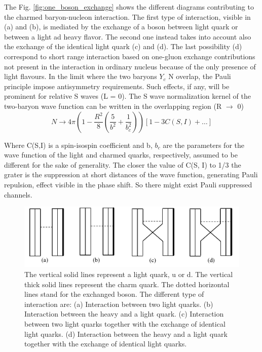 \documentclass[12pt,a4paper]{book}
\begin{document}
	The Fig. \ref{fig:one_boson_exchange} shows the different diagrams contributing to the charmed baryon-nucleon interaction. The first type of interaction, visible in (a) and (b), is mediated by the exchange of a boson between light quark or between a light ad heavy flavor. The second one instead takes into account also the exchange of the identical light quark (c) and (d). The last possibility (d) correspond to short range interaction based on one-gluon exchange contributions not present in the interaction in ordinary nucleus because of the only presence of light flavours. In the limit where the two baryons $Y_c$ N overlap, the Pauli principle impose antisymmetry requirements. Such effects, if any, will be prominent for relative S waves (L = 0).
	The S wave normalization kernel of the two-baryon wave function can be written in the overlapping region (R $\rightarrow$ 0)
	\begin{equation}
		N \rightarrow  4 \pi \left( 1 - \frac{R^2}{8} \left( \frac{5}{b^2} + \frac{1}{b_c^2} \right) \right) \left[ 1 - 3C(S,I) + \dots \right]
	\end{equation}
	
	Where C(S,I) is a spin-isospin coefficient and b, $b_c$ are the parameters for the wave function of the light and charmed quarks, respectively, assumed to be different for the
	sake of generality. The closer the value of C(S, I) to 1/3 the grater is  the suppression at short distances of the wave function, generating Pauli repulsion, effect visible in the phase shift. So there might exist Pauli suppressed channels. 
	
	\begin{figure}[ht]
		\centering
		\includegraphics[width=0.7\linewidth]{pictures/charmed_nucleos_interaction.png}
		\caption{ The vertical solid lines represent a light quark, u or d. The vertical thick solid lines represent the charm quark. The dotted horizontal lines stand for the exchanged boson. The different type of interaction are: (a) Interaction between two light quarks. (b) Interaction between the heavy and a light quark. (c) Interaction between	two light quarks together with the exchange of identical light quarks. (d) Interaction between the	heavy and a light quark together with the exchange of identical light quarks.}
		\label{fig:charmed_nucleos_interaction} 
	\end{figure}
	
\end{document}

